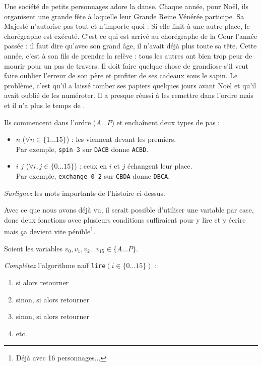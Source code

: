 Une société de petits personnages adore la danse. Chaque année, pour Noël, ils
organisent une grande fête à laquelle leur Grande Reine Vénérée participe. Sa
Majesté n'autorise pas tout et n'importe quoi : 
Si elle finit à une autre place, le
chorégraphe est exécuté. C'est ce qui est arrivé au chorégraphe de la Cour
l'année passée : il faut dire qu'avec son grand âge, il n'avait déjà plus toute
sa tête. Cette année, c'est à son fils de prendre la relève : tous les autres
ont bien trop peur de mourir pour un pas de travers. Il doit faire quelque
chose de grandiose s'il veut faire oublier l'erreur de son père et profiter de
ses cadeaux sous le sapin.
Le problème, c'est qu'il a laissé tomber ses papiers quelques
jours avant Noël et qu'il avait oublié de les numéroter.
Il a presque réussi à les remettre dans l'ordre mais  et il n'a plus le temps de .

\begin{minipage}{\textwidth}
Ils commencent dans l'ordre (${A\dots P}$) et enchaînent deux types de pas :
\begin{itemize}
\item {} $n$ ($\forall n \in \{1\dots15\}$) :
	les  viennent devant les premiers. \\
	Par exemple, \texttt{spin 3} sur \texttt{DACB} donne \texttt{ACBD}.
\item {} $i$ $j$ ($\forall i,j \in \{0\dots15\}$) :
	ceux en $i$ et $j$ échangent leur place. \\
	Par exemple, \texttt{exchange 0 2} sur \texttt{CBDA} donne \texttt{DBCA}.
\end{itemize}
\end{minipage}

\begin{exo}
\emph{Surlignez} les mots importants de l'histoire ci-dessus.
\end{exo}

Avec ce que nous avons déjà vu, il serait possible d'utiliser une variable par
case, donc deux fonctions avec plusieurs conditions suffiraient pour y lire et
y écrire mais ça devient vite pénible\footnote{Déjà avec 16 personnages...}.

Soient les variables $v_0, v_1, v_2\dots v_{15} \in\{A\dots P\}$.

\begin{exo}
\emph{Complétez} l'algorithme naïf \texttt{lire}$(i\in\{0\dots15\})$ :
\begin{enumerate}
\item si  alors retourner 
\item sinon, si  alors retourner 
\item sinon, si  alors retourner 
\item etc.
\end{enumerate}
\end{exo}

